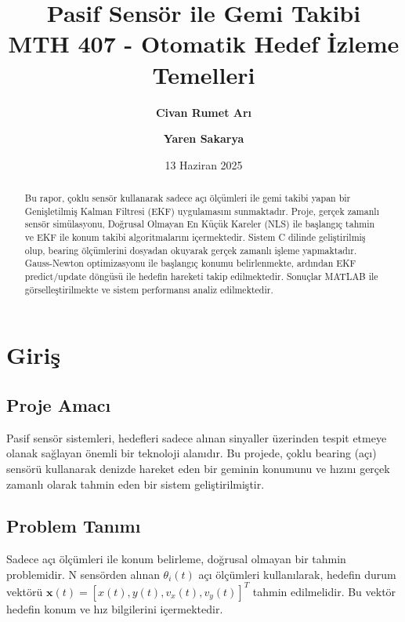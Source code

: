 \documentclass[12pt,a4paper]{article}
\title{
    \LARGE \textbf{Pasif Sens\"{o}r ile Gemi Takibi} \\
    \large MTH 407 - Otomatik Hedef \.{I}zleme Temelleri
}
\author{
    \textbf{Civan Rumet Ar{\i}} \and \textbf{Yaren Sakarya} \\
}
\date{13 Haziran 2025}
\begin{document}
\maketitle

\begin{abstract}
Bu rapor, \c{c}oklu sens\"{o}r kullanarak sadece a\c{c}{\i} \"{o}l\c{c}\"{u}mleri ile gemi takibi yapan bir Geni\c{s}letilmi\c{s} Kalman Filtresi (EKF) uygulamas{\i}n{\i} sunmaktad{\i}r. Proje, ger\c{c}ek zamanl{\i} sens\"{o}r sim\"{u}lasyonu, Do\u{g}rusal Olmayan En K\"{u}\c{c}\"{u}k Kareler (NLS) ile ba\c{s}lang{\i}\c{c} tahmin ve EKF ile konum takibi algoritmalar{\i}n{\i} i\c{c}ermektedir. Sistem C dilinde geli\c{s}tirilmi\c{s} olup, bearing \"{o}l\c{c}\"{u}mlerini dosyadan okuyarak ger\c{c}ek zamanl{\i} i\c{s}leme yapmaktad{\i}r. Gauss-Newton optimizasyonu ile ba\c{s}lang{\i}\c{c} konumu belirlenmekte, ard{\i}ndan EKF predict/update d\"{o}ng\"{u}s\"{u} ile hedefin hareketi takip edilmektedir. Sonu\c{c}lar MATLAB ile g\"{o}rselle\c{s}tirilmekte ve sistem performans{\i} analiz edilmektedir.

\end{abstract}

\tableofcontents
\newpage

\section{Giri\c{s}}

\subsection{Proje Amac{\i}}
Pasif sens\"{o}r sistemleri, hedefleri sadece al{\i}nan sinyaller \"{u}zerinden tespit etmeye olanak sa\u{g}layan \"{o}nemli bir teknoloji alan{\i}d{\i}r. Bu projede, \c{c}oklu bearing (a\c{c}{\i}) sens\"{o}r\"{u} kullanarak denizde hareket eden bir geminin konumunu ve h{\i}z{\i}n{\i} ger\c{c}ek zamanl{\i} olarak tahmin eden bir sistem geli\c{s}tirilmi\c{s}tir.

\subsection{Problem Tan{\i}m{\i}}
Sadece a\c{c}{\i} \"{o}l\c{c}\"{u}mleri ile konum belirleme, do\u{g}rusal olmayan bir tahmin problemidir. N sens\"{o}rden al{\i}nan $\theta_i(t)$ a\c{c}{\i} \"{o}l\c{c}\"{u}mleri kullan{\i}larak, hedefin durum vekt\"{o}r\"{u} $\mathbf{x}(t) = [x(t), y(t), v_x(t), v_y(t)]^T$ tahmin edilmelidir. Bu vekt\"{o}r hedefin konum ve h{\i}z bilgilerini i\c{c}ermektedir.
\end{document}
